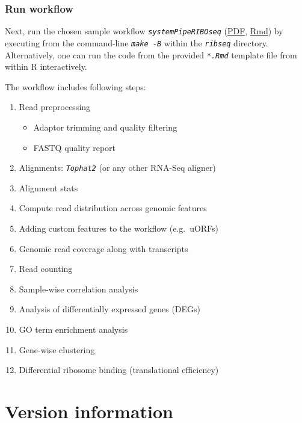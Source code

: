 \documentclass[14pt,]{article}
\providecommand{\tightlist}{%
  \setlength{\itemsep}{0pt}\setlength{\parskip}{0pt}}
\begin{document}
\hypertarget{run-workflow-3}{%
\subsubsection{Run workflow}\label{run-workflow-3}}

Next, run the chosen sample workflow \emph{\texttt{systemPipeRIBOseq}} (\href{https://github.com/tgirke/systemPipeRdata/blob/master/inst/extdata/workflows/riboseq/systemPipeRIBOseq.pdf?raw=true}{PDF}, \href{https://github.com/tgirke/systemPipeRdata/blob/master/inst/extdata/workflows/ribseq/systemPipeRIBOseq.Rmd}{Rmd}) by executing from the command-line \emph{\texttt{make -B}} within the \emph{\texttt{ribseq}} directory. Alternatively, one can run the code from the provided \emph{\texttt{*.Rmd}} template file from within R interactively.

The workflow includes following steps:

\begin{enumerate}
\def\labelenumi{\arabic{enumi}.}
\tightlist
\item
  Read preprocessing

  \begin{itemize}
  \tightlist
  \item
    Adaptor trimming and quality filtering
  \item
    FASTQ quality report
  \end{itemize}
\item
  Alignments: \emph{\texttt{Tophat2}} (or any other RNA-Seq aligner)
\item
  Alignment stats
\item
  Compute read distribution across genomic features
\item
  Adding custom features to the workflow (e.g.~uORFs)
\item
  Genomic read coverage along with transcripts
\item
  Read counting
\item
  Sample-wise correlation analysis
\item
  Analysis of differentially expressed genes (DEGs)
\item
  GO term enrichment analysis
\item
  Gene-wise clustering
\item
  Differential ribosome binding (translational efficiency)
\end{enumerate}

\hypertarget{version-information}{%
\section{Version information}\label{version-information}}
\end{document}
